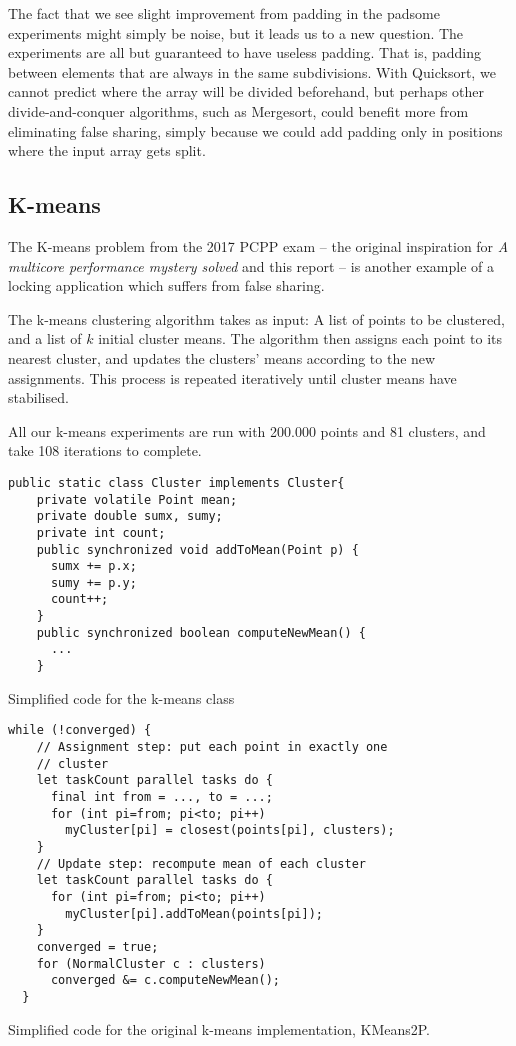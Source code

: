 The fact that we see slight improvement from padding in the padsome experiments
might simply be noise, but it leads us to a new question. The experiments are
all but guaranteed to have useless padding. That is, padding between elements
that are always in the same subdivisions. With Quicksort, we cannot predict
where the array will be divided beforehand, but perhaps other divide-and-conquer
algorithms, such as Mergesort, could benefit more from eliminating false
sharing, simply because we could add padding only in positions where the input
array gets split.

\subsection{K-means}
The K-means problem from the 2017 PCPP exam -- the original inspiration for
\textit{A multicore performance mystery solved}\cite{mystery} and this report --
is another example of a locking application which suffers from false sharing.

The k-means clustering algorithm takes as input: A list of points to be
clustered, and a list of $k$ initial cluster means. The algorithm then
assigns each point to its nearest cluster, and updates the clusters'
means according to the new assignments. This process is repeated iteratively
until cluster means have stabilised.

All our k-means experiments are run with 200.000 points and 81 clusters, and
take 108 iterations to complete.

\begin{code}
\begin{Verbatim}[frame=single]
  public static class Cluster implements Cluster{
    private volatile Point mean;
    private double sumx, sumy;
    private int count;
    public synchronized void addToMean(Point p) {
      sumx += p.x;
      sumy += p.y;
      count++;
    }
    public synchronized boolean computeNewMean() {
      ...
    }
\end{Verbatim}
	\caption{Simplified code for the k-means  class}
	\label{code:cluster}
\end{code}

\begin{code}
\begin{Verbatim}[frame=single]
  while (!converged) {
    // Assignment step: put each point in exactly one
    // cluster
    let taskCount parallel tasks do {
      final int from = ..., to = ...;
      for (int pi=from; pi<to; pi++) 
        myCluster[pi] = closest(points[pi], clusters);
    }
    // Update step: recompute mean of each cluster
    let taskCount parallel tasks do {
      for (int pi=from; pi<to; pi++)
        myCluster[pi].addToMean(points[pi]);
    }
    converged = true;
    for (NormalCluster c : clusters)
      converged &= c.computeNewMean();
  }
\end{Verbatim}
	\caption{Simplified code for the original k-means implementation, KMeans2P.}
	\label{code:kmeans2p}
\end{code}


